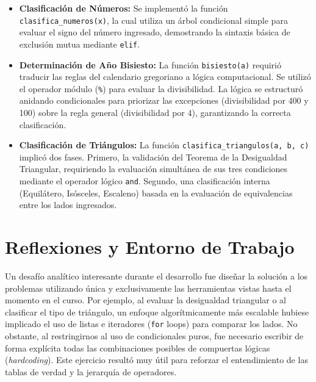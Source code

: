 \documentclass[11pt]{article}
\begin{document}
\begin{itemize}
    \item \textbf{Clasificación de Números:} Se implementó la función \texttt{clasifica\_numeros(x)}, la cual utiliza un árbol condicional simple para evaluar el signo del número ingresado, demostrando la sintaxis básica de exclusión mutua mediante \texttt{elif}.
    
    \item \textbf{Determinación de Año Bisiesto:} La función \texttt{bisiesto(a)} requirió traducir las reglas del calendario gregoriano a lógica computacional. Se utilizó el operador módulo (\texttt{\%}) para evaluar la divisibilidad. La lógica se estructuró anidando condicionales para priorizar las excepciones (divisibilidad por 400 y 100) sobre la regla general (divisibilidad por 4), garantizando la correcta clasificación.
    
    \item \textbf{Clasificación de Triángulos:} La función \texttt{clasifica\_triangulos(a, b, c)} implicó dos fases. Primero, la validación del Teorema de la Desigualdad Triangular, requiriendo la evaluación simultánea de sus tres condiciones mediante el operador lógico \texttt{and}. Segundo, una clasificación interna (Equilátero, Isósceles, Escaleno) basada en la evaluación de equivalencias entre los lados ingresados.
\end{itemize}

\section{Reflexiones y Entorno de Trabajo}

Un desafío analítico interesante durante el desarrollo fue diseñar la solución a los problemas utilizando única y exclusivamente las herramientas vistas hasta el momento en el curso. Por ejemplo, al evaluar la desigualdad triangular o al clasificar el tipo de triángulo, un enfoque algorítmicamente más escalable hubiese implicado el uso de listas e iteradores (\texttt{for} loops) para comparar los lados. No obstante, al restringirnos al uso de condicionales puros, fue necesario escribir de forma explícita todas las combinaciones posibles de compuertas lógicas (\textit{hardcoding}). Este ejercicio resultó muy útil para reforzar el entendimiento de las tablas de verdad y la jerarquía de operadores.
\end{document}

